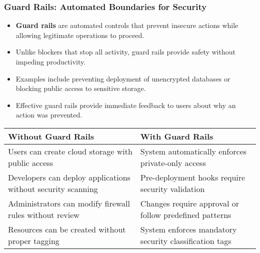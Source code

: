 \documentclass{beamer}
\begin{document}
\begin{frame}
  \frametitle{Guard Rails: Automated Boundaries for Security}
  
  \begin{itemize}
    \item \textbf{Guard rails} are automated controls that prevent insecure actions while allowing legitimate operations to proceed.
    \item Unlike blockers that stop all activity, guard rails provide safety without impeding productivity.
    \item Examples include preventing deployment of unencrypted databases or blocking public access to sensitive storage.
    \item Effective guard rails provide immediate feedback to users about why an action was prevented.
  \end{itemize}
  
  \begin{table}
    \scriptsize
    \begin{tabular}{|p{}|p{}|}
      \hline
      \textbf{Without Guard Rails} & \textbf{With Guard Rails} \\
      \hline
      Users can create cloud storage with public access & System automatically enforces private-only access \\
      \hline
      Developers can deploy applications without security scanning & Pre-deployment hooks require security validation \\
      \hline
      Administrators can modify firewall rules without review & Changes require approval or follow predefined patterns \\
      \hline
      Resources can be created without proper tagging & System enforces mandatory security classification tags \\
      \hline
    \end{tabular}
  \end{table}
\end{frame}
\end{document}
